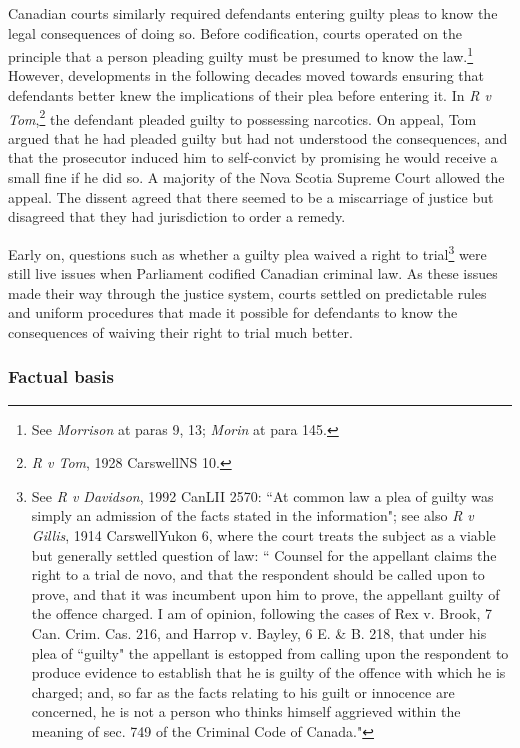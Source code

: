 Canadian courts similarly required defendants entering guilty pleas to know the legal consequences of doing so. Before codification, courts operated on the principle that a person pleading guilty must be presumed to know the law.\footnote{See \textit{Morrison} at paras 9, 13; \textit{Morin} at para 145.} However, developments in the following decades moved towards ensuring that defendants better knew the implications of their plea before entering it. In \textit{R v Tom},\footnote{\textit{R v Tom}, 1928 CarswellNS 10.} the defendant pleaded guilty to possessing narcotics. On appeal, Tom argued that he had pleaded guilty but had not understood the consequences, and that the prosecutor induced him to self-convict by promising he would receive a small fine if he did so. A majority of the Nova Scotia Supreme Court allowed the appeal. The dissent agreed that there seemed to be a miscarriage of justice but disagreed that they had jurisdiction to order a remedy.

Early on, questions such as whether a guilty plea waived a right to trial\footnote{See \textit{R v Davidson}, 1992 CanLII 2570: ``At common law a plea of guilty was simply an admission of the facts stated in the information"; see also \textit{R v Gillis}, 1914 CarswellYukon 6, where the court treats the subject as a viable but generally settled question of law: `` Counsel for the appellant claims the right to a trial de novo, and that the respondent should be called upon to prove, and that it was incumbent upon him to prove, the appellant guilty of the offence charged. I am of opinion, following the cases of Rex v. Brook, 7 Can. Crim. Cas. 216, and Harrop v. Bayley, 6 E. \& B. 218, that under his plea of ``guilty" the appellant is estopped from calling upon the respondent to produce evidence to establish that he is guilty of the offence with which he is charged; and, so far as the facts relating to his guilt or innocence are concerned, he is not a person who thinks himself aggrieved within the meaning of sec. 749 of the Criminal Code of Canada."} were still live issues when Parliament codified Canadian criminal law. As these issues made their way through the justice system, courts settled on predictable rules and uniform procedures that made it possible for defendants to know the consequences of waiving their right to trial much better.

\subsubsection{Factual basis}

